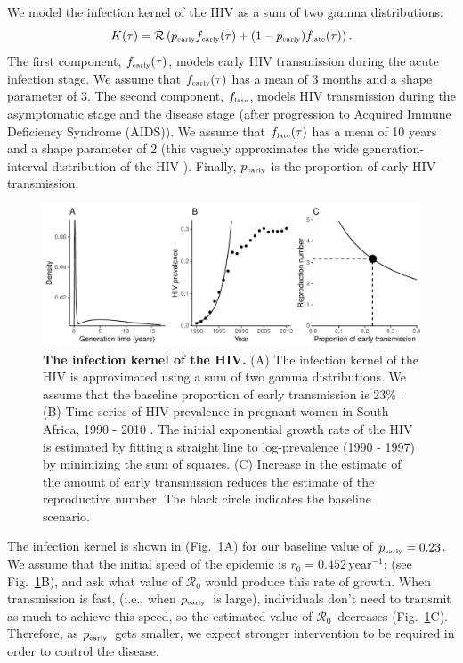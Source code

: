 \documentclass[12pt]{article}
\newcommand{\Rx}[1]{\ensuremath{{\mathcal R}_{#1}}}
\newcommand{\Ro}{\Rx{0}}
\newcommand{\tsub}[2]{#1_{{\textrm{\tiny #2}}}}
\newcommand{\pEarly}{\ensuremath{\tsub{p}{early}}}
\newcommand{\figref}[1]{Fig.~\ref{fig:#1}}
\newcommand{\figlab}[1]{\label{fig:#1}}
\begin{document}
We model the infection kernel of the HIV as a sum of two gamma distributions:
\begin{equation}
K(\tau) = \mathcal R \left(\tsub{p}{early} \tsub{f}{early}(\tau) + (1-\tsub{p}{early}) \tsub{f}{late}(\tau) \right).
\end{equation}
The first component, $\tsub{f}{early}(\tau)$, models early HIV transmission during the acute infection stage.
We assume that $\tsub{f}{early}(\tau)$ has a mean of 3 months \citep{hollingsworth2008hiv} and a shape parameter of 3.
The second component, $\tsub{f}{late}$, models HIV transmission during the asymptomatic stage and the disease stage (after progression to Acquired Immune Deficiency Syndrome (AIDS)).
We assume that $\tsub{f}{late}(\tau)$ has a mean of 10 years \citep{brookmeyer1989censoring, nishiura2019estimating} and a shape parameter of 2 (this vaguely approximates the wide generation-interval distribution of the HIV \citep{fraser2004factors}).
Finally, $\tsub{p}{early}$ is the proportion of early HIV transmission.

\begin{figure}[!th]
\includegraphics[width=\textwidth]{../figure/HIV.pdf}
\caption{
\textbf{The infection kernel of the HIV.}
(A) The infection kernel of the HIV is approximated using a sum of two gamma distributions. We assume that the baseline proportion of early transmission is 23\% \citep{hayes2006amplified}.
(B) Time series of HIV prevalence in pregnant women in South Africa, 1990 - 2010 \citep{barron2013eliminating}. The initial exponential growth rate of the HIV is estimated by fitting a straight line to log-prevalence (1990 - 1997) by minimizing the sum of squares.
(C) Increase in the estimate of the amount of early transmission reduces the estimate of the reproductive number.
The black circle indicates the baseline scenario.
}
\figlab{example}
\end{figure}

The infection kernel is shown in (\figref{example}A) for our baseline value of  
$\tsub{p}{early} = 0.23$.  We assume that the initial speed of the epidemic is $r_0=0.452\,\mathrm{year}^{-1}$; \citep{barron2013eliminating} (see \figref{example}B), and ask what value of $\Ro$ would produce this rate of growth.
When transmission is fast, (i.e., when \pEarly\ is large), individuals don't need to transmit as much to achieve this speed, so the estimated value of \Ro\ decreases (\figref{example}C).
Therefore, as \pEarly\ gets smaller, we expect stronger intervention to be required in order to control the disease.
\end{document}
